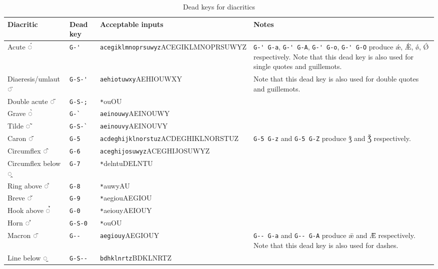 \documentclass[oneside]{memoir}
\makeatletter
\newcommand{\key}{\verb}
\newcommand{\keynv}{\texttt}
\newcommand{\out}[1]{\colorbox{gray!20}{#1}}
\def\ins{\@ifstar\@ins\@@ins}
\newcommand{\@ins}[2]{\keynv{#1}\quad\keynv{#2}}
\newcommand{\@@ins}[2]{\makecell{\keynv{#1}\\\keynv{#2}}}
\makeatother
\begin{document}
\begin{table}
\centerfloat
\caption{Dead keys for diacritics}
\label{tab:dk_for_diacritics}
\renewcommand{\arraystretch}{1.5}
\begin{tabularx}{0.83\paperwidth}{lllX}
\toprule
Diacritic & Dead key & Acceptable inputs & Notes \\
\midrule
Acute ◌́            & \key|G-'|   & \ins{acegiklmnoprsuwyz}{ACEGIKLMNOPRSUWYZ}      &
  \key|G-' G-a|, \key|G-' G-A|, \key|G-' G-o|, \key|G-' G-O| produce \out{ǽ}, \out{Ǽ}, \out{ǿ}, \out{Ǿ} respectively. \newline
  Note that this dead key is also used for single quotes and guillemots. \\
Diaeresis/umlaut ◌̈ & \key|G-S-'| & \ins{aehiotuwxy}{AEHIOUWXY}                     & Note that this dead key is also used for double quotes and guillemots. \\
Double acute ◌̋     & \key|G-S-;| & \ins*{ou}{OU}                                   & \\
Grave ◌̀            & \key|G-`|   & \ins{aeinouwy}{AEINOUWY}                        & \\
Tilde ◌̃            & \key|G-S-`| & \ins{aeinouvy}{AEINOUVY}                        & \\
Caron ◌̌            & \key|G-5|   & \ins{acdeghijklnorstuz}{ACDEGHIKLNORSTUZ}       & \key|G-5 G-z| and \key|G-5 G-Z| produce \out{ǯ} and \out{Ǯ} respectively. \\
Circumflex ◌̂       & \key|G-6|   & \ins{aceghijosuwyz}{ACEGHIJOSUWYZ}              & \\
Circumflex below ◌̭ & \key|G-7|   & \ins*{delntu}{DELNTU}                           & \\
Ring above ◌̊       & \key|G-8|   & \ins*{auwy}{AU}                                 & \\
Breve ◌̆            & \key|G-9|   & \ins*{aegiou}{AEGIOU}                           & \\
Hook above ◌̉       & \key|G-0|   & \ins*{aeiouy}{AEIOUY}                           & \\
Horn ◌̛             & \key|G-S-0| & \ins*{ou}{OU}                                   & \\
Macron ◌̄           & \key|G--|   & \ins{aegiouy}{AEGIOUY}                          &
  \key|G-- G-a| and \key|G-- G-A| produce \out{ǣ} and \out{Ǣ} respectively. \newline
  Note that this dead key is also used for dashes. \\
Line below ◌̱       & \key|G-S--| & \ins{bdhklnrtz}{BDKLNRTZ}                       & \\

\end{tabularx}
\end{table}
\end{document}

